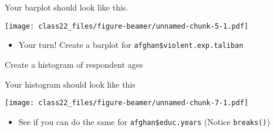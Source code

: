 \documentclass[ignorenonframetext,]{beamer}
\newenvironment{Shaded}{\begin{snugshade}}{\end{snugshade}}
\newcommand{\KeywordTok}[1]{\textcolor[rgb]{0.13,0.29,0.53}{\textbf{#1}}}
\newcommand{\DataTypeTok}[1]{\textcolor[rgb]{0.13,0.29,0.53}{#1}}
\newcommand{\DecValTok}[1]{\textcolor[rgb]{0.00,0.00,0.81}{#1}}
\newcommand{\FloatTok}[1]{\textcolor[rgb]{0.00,0.00,0.81}{#1}}
\newcommand{\StringTok}[1]{\textcolor[rgb]{0.31,0.60,0.02}{#1}}
\newcommand{\OtherTok}[1]{\textcolor[rgb]{0.56,0.35,0.01}{#1}}
\newcommand{\OperatorTok}[1]{\textcolor[rgb]{0.81,0.36,0.00}{\textbf{#1}}}
\newcommand{\NormalTok}[1]{#1}
\providecommand{\tightlist}{%
	\setlength{\itemsep}{0pt}\setlength{\parskip}{0pt}}
\begin{document}
\begin{frame}[fragile]{Your barplot should look like this.}

\texttt{[image: class22\_files/figure-beamer/unnamed-chunk-5-1.pdf]}

\begin{itemize}
\tightlist
\item
  Your turn! Create a barplot for \texttt{afghan\$violent.exp.taliban}
\end{itemize}

\end{frame}

\begin{frame}[fragile]{Create a histogram of respondent ages}

\begin{Shaded}
\end{Shaded}

\end{frame}

\begin{frame}[fragile]{Your histogram should look like this}

\texttt{[image: class22\_files/figure-beamer/unnamed-chunk-7-1.pdf]}

\begin{itemize}
\tightlist
\item
  See if you can do the same for \texttt{afghan\$educ.years} (Notice
  \texttt{breaks()})
\end{itemize}

\end{frame}
\end{document}
